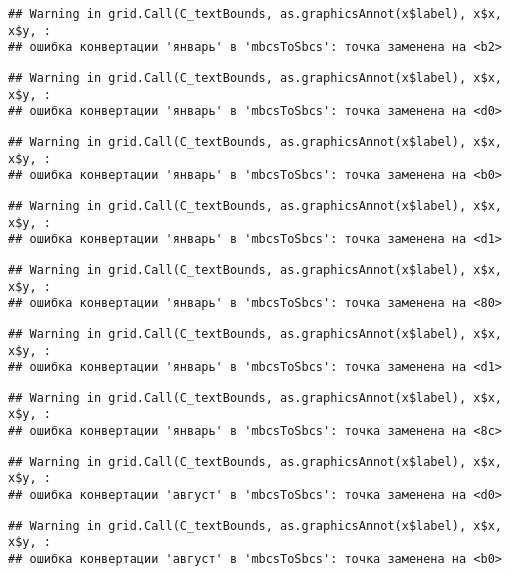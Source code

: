 \documentclass[
]{article}
\begin{document}
\begin{verbatim}
## Warning in grid.Call(C_textBounds, as.graphicsAnnot(x$label), x$x, x$y, :
## ошибка конвертации 'январь' в 'mbcsToSbcs': точка заменена на <b2>
\end{verbatim}

\begin{verbatim}
## Warning in grid.Call(C_textBounds, as.graphicsAnnot(x$label), x$x, x$y, :
## ошибка конвертации 'январь' в 'mbcsToSbcs': точка заменена на <d0>
\end{verbatim}

\begin{verbatim}
## Warning in grid.Call(C_textBounds, as.graphicsAnnot(x$label), x$x, x$y, :
## ошибка конвертации 'январь' в 'mbcsToSbcs': точка заменена на <b0>
\end{verbatim}

\begin{verbatim}
## Warning in grid.Call(C_textBounds, as.graphicsAnnot(x$label), x$x, x$y, :
## ошибка конвертации 'январь' в 'mbcsToSbcs': точка заменена на <d1>
\end{verbatim}

\begin{verbatim}
## Warning in grid.Call(C_textBounds, as.graphicsAnnot(x$label), x$x, x$y, :
## ошибка конвертации 'январь' в 'mbcsToSbcs': точка заменена на <80>
\end{verbatim}

\begin{verbatim}
## Warning in grid.Call(C_textBounds, as.graphicsAnnot(x$label), x$x, x$y, :
## ошибка конвертации 'январь' в 'mbcsToSbcs': точка заменена на <d1>
\end{verbatim}

\begin{verbatim}
## Warning in grid.Call(C_textBounds, as.graphicsAnnot(x$label), x$x, x$y, :
## ошибка конвертации 'январь' в 'mbcsToSbcs': точка заменена на <8c>
\end{verbatim}

\begin{verbatim}
## Warning in grid.Call(C_textBounds, as.graphicsAnnot(x$label), x$x, x$y, :
## ошибка конвертации 'август' в 'mbcsToSbcs': точка заменена на <d0>
\end{verbatim}

\begin{verbatim}
## Warning in grid.Call(C_textBounds, as.graphicsAnnot(x$label), x$x, x$y, :
## ошибка конвертации 'август' в 'mbcsToSbcs': точка заменена на <b0>
\end{verbatim}
\end{document}
